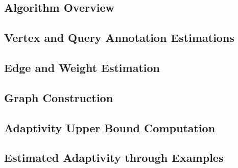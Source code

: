 \documentclass[12pt, letterpaper]{report}   %
\begin{document}
\subsection{Algorithm Overview}
\label{sec:static-overview}
% 



% 

% 

\subsection{Vertex and Query Annotation Estimations}
\label{sec:alg_vertexgen}



\subsection{Edge and Weight Estimation}
\label{sec:alg_weightedgegen}


\subsection{Graph Construction}
\label{sec:alg_graphgen}


\subsection{Adaptivity Upper Bound Computation}
\label{sec:alg_adaptcompute}



\subsection{Estimated Adaptivity through Examples}
\label{sec:static-examples}



\clearpage
\end{document}
